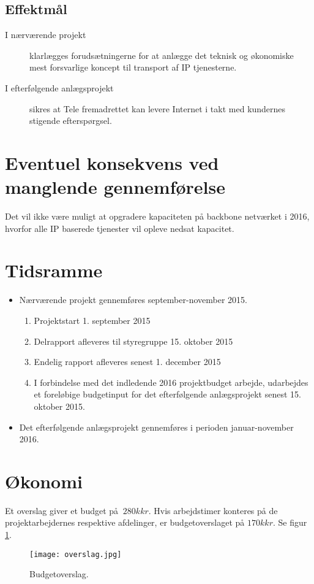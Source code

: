 \documentclass[11pt,a4paper]{article}
\begin{document}
\subsection{Effektmål}
\begin{description}
\item [I nærværende projekt ]klarlægges forudsætningerne for at anlægge det teknisk og økonomiske mest forsvarlige koncept til transport af IP tjenesterne.
\item [I efterfølgende anlægsprojekt] sikres at Tele fremadrettet kan levere Internet i takt med kundernes stigende efterspørgsel.
\end{description}
\section{Eventuel konsekvens ved manglende gennemførelse}
Det vil ikke være muligt at opgradere kapaciteten på backbone netværket i 2016, hvorfor alle IP baserede tjenester vil opleve nedsat kapacitet.
\section{Tidsramme}
\begin{itemize}
\item Nærværende projekt gennemføres september-november 2015.
\begin{enumerate}
\item Projektstart 1. september 2015
\item Delrapport afleveres til styregruppe 15. oktober 2015
\item Endelig rapport afleveres senest 1. december 2015
\item I forbindelse med det indledende 2016 projektbudget arbejde, udarbejdes et foreløbige budgetinput for det efterfølgende anlægsprojekt senest 15. oktober 2015.
\end{enumerate}
\item Det efterfølgende anlægsprojekt gennemføres i perioden januar-november 2016.
\end{itemize}
\section{Økonomi}
Et overslag giver et budget på $~280kkr$. Hvis arbejdstimer konteres på de projektarbejdernes respektive afdelinger, er budgetoverslaget på \boldmath$170kkr$. Se figur \ref{fig:budgetoverslag}.
\begin{figure}[ht]
\centering
\texttt{[image: overslag.jpg]}
\caption{Budgetoverslag.}
\label{fig:budgetoverslag}
\end{figure}
\FloatBarrier
\end{document}

